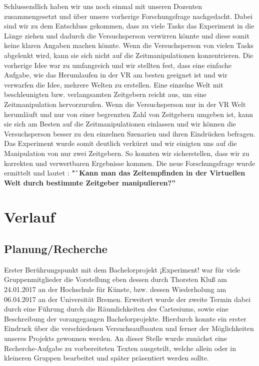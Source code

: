 \documentclass{Bericht}
\begin{document}
	Schlussendlich haben wir uns noch einmal mit unseren Dozenten zusammengesetzt und über unsere vorherige Forschungsfrage nachgedacht. Dabei sind wir zu dem Entschluss gekommen, dass zu viele Tasks das Experiment in die Länge ziehen und dadurch die Versuchsperson verwirren könnte und diese somit keine klaren Angaben machen könnte. Wenn die Versuchsperson von vielen Tasks abgelenkt wird, kann sie sich nicht auf die Zeitmanipulationen konzentrieren. Die vorherige Idee war zu umfangreich und wir stellten fest, dass eine einfache Aufgabe, wie das Herumlaufen in der VR am besten geeignet ist und wir verwarfen die Idee, mehrere Welten zu erstellen. Eine einzelne Welt mit beschleunigten bzw. verlangsamten Zeitgebern reicht aus, um eine Zeitmanipulation hervorzurufen. Wenn die Versuchsperson nur in der VR Welt herumläuft und nur von einer begrenzten Zahl von Zeitgebern umgeben ist, kann sie sich am Besten auf die Zeitmanipulationen einlassen und wir können die Versuchsperson besser zu den einzelnen Szenarien und ihren Eindrücken befragen. 
 Das Experiment wurde somit deutlich verkürzt und wir einigten uns auf die Manipulation von nur zwei Zeitgebern. So konnten wir sicherstellen, dass wir zu korrekten und verwertbaren Ergebnisse kommen. Die neue Forschungsfrage wurde ermittelt und lautet : \textbf{"`Kann man das Zeitempfinden in der Virtuellen Welt durch bestimmte Zeitgeber manipulieren?''}
 

\newpage
\section{Verlauf} %
	\subsection{Planung/Recherche} %
		Erster Berührungspunkt mit dem Bachelorprojekt ¡Experiment! war für viele Gruppenmitglieder die Vorstellung eben dessen durch Thorsten Kluß am 24.01.2017 an der Hochschule für Künste, bzw. dessen Wiederholung am 06.04.2017 an der Universität Bremen. Erweitert wurde der zweite Termin dabei durch eine Führung durch die Räumlichkeiten des Cartesiums, sowie eine Beschreibung der vorangegangen Bachelorprojekte. Hierdurch konnte ein erster Eindruck über die verschiedenen Versuchsaufbauten und ferner der Möglichkeiten unseres Projekts gewonnen werden. An dieser Stelle wurde zunächst eine Recherche-Aufgabe zu vorbereiteten Texten ausgeteilt, welche allein oder in kleineren Gruppen bearbeitet und später präsentiert werden sollte.
\end{document}

